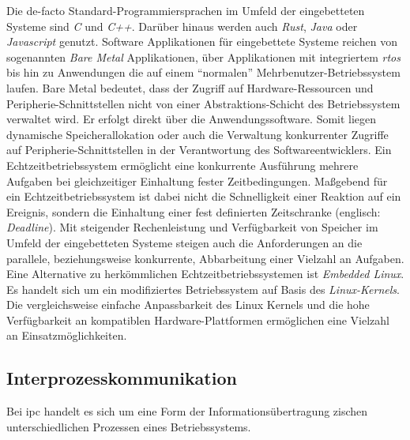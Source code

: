 Die de-facto Standard-Programmiersprachen im Umfeld der eingebetteten Systeme
sind \textit{C} und \textit{C++}.
Darüber hinaus werden auch \textit{Rust}, \textit{Java} oder
\textit{Javascript} genutzt.
\newline
Software Applikationen für eingebettete Systeme reichen von sogenannten
\textit{Bare Metal} Applikationen, über Applikationen mit integriertem
\textit{\ac{rtos}} bis hin zu Anwendungen die auf einem \enquote{normalen}
Mehrbenutzer-Betriebssystem laufen.
\newline
Bare Metal bedeutet, dass der Zugriff auf Hardware-Ressourcen und
Peripherie-Schnittstellen nicht von einer Abstraktions-Schicht des
Betriebssystem verwaltet wird.
Er erfolgt direkt über die Anwendungssoftware.
Somit liegen dynamische Speicherallokation oder auch die Verwaltung
konkurrenter Zugriffe auf Peripherie-Schnittstellen in der Verantwortung des
Softwareentwicklers.
\newline
Ein Echtzeitbetriebssystem ermöglicht eine konkurrente Ausführung mehrere
Aufgaben bei gleichzeitiger Einhaltung fester Zeitbedingungen.
Maßgebend für ein Echtzeitbetriebssystem ist dabei nicht die Schnelligkeit
einer Reaktion auf ein Ereignis, sondern die Einhaltung einer fest definierten
Zeitschranke (englisch: \textit{Deadline})\cite{BSKompakt_GrundlagenBs}.
\newline
Mit steigender Rechenleistung und Verfügbarkeit von Speicher im Umfeld der
eingebetteten Systeme steigen auch die Anforderungen an die parallele,
beziehungsweise konkurrente, Abbarbeitung einer Vielzahl an Aufgaben.
Eine Alternative zu herkömmlichen Echtzeitbetriebssystemen ist \textit{Embedded
Linux}.
Es handelt sich um ein modifiziertes Betriebssystem auf Basis des
\textit{Linux-Kernels}.
Die vergleichsweise einfache Anpassbarkeit des Linux Kernels und die hohe
Verfügbarkeit an kompatiblen Hardware-Plattformen ermöglichen eine Vielzahl an
Einsatzmöglichkeiten\cite{UbuntuBlogEmbeddedLinux}.

\subsection{Interprozesskommunikation}

Bei \ac{ipc} handelt es sich um eine Form der Informationsübertragung zischen
unterschiedlichen Prozessen eines Betriebssystems.
